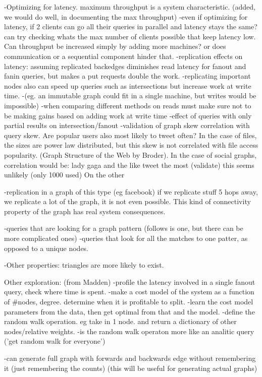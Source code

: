 \documentclass{article}
\begin{document}
-Optimizing for latency. maximum throughput is a system characteristic. (added, we would do well, in documenting the max throughput) 
-even if optimizing for latency, if 2 clients can go all their queries in parallel and latency stays the same? can try checking whats the max number
of clients possible that keep latency low. Can throughput be increased simply by adding more machines? or does communication or a sequential component hinder that.
-replication effects on latency: assuming replicated backedges diminishes read latency for fanout and fanin queries, but makes a put requests double the work.
-replicating important  nodes also can speed up queries such as intersections but increase work at write time.
-(eg. an immutable graph could fit in a single machine, but writes would be impossible)
-when comparing different methods on reads must make sure not to be making gains based on adding work at write time
-effect of queries with only partial results on intersection/fanout
-validation of graph skew correlation with query skew. Are popular users also most likely to tweet often?  In the case of files,
the sizes are power law distributed, but this skew is not correlated with file access popularity. (Graph Structure of the Web by Broder).
In the case of social graphs, correlation would be: lady gaga and the like tweet the most (validate) this seems unlikely (only 1000 used)
On the other 

-replication in a graph of this type (eg facebook) if we replicate stuff 5 hops away, we replicate a lot of the graph, it is not even possible.
This kind of connectivity property of the graph has real system consequences.   

-queries that are looking for a graph pattern (follows is one, but there can be more complicated ones)
-queries that look for all the matches to one patter, as opposed to  a unique nodes.

-Other properties: triangles are more likely to exist.

Other exploration: (from Madden)
-profile the latency involved in a single fanout query, check where time is spent.
-make a cost model of the system as a function of #nodes, degree. determine when it is profitable to split.
-learn the cost model parameters from the data, then get optimal from that and the model.
-define the random walk operation. eg take in 1 node. and return a dictionary of other nodes/relative weights.
-is the random walk operaton more like an analitic query ('get random walk for everyone')


-can generate full graph with forwards and backwards edge without remembering it (just remembering the counts)
 (this will be useful for generating actual graphs)
\end{document}
